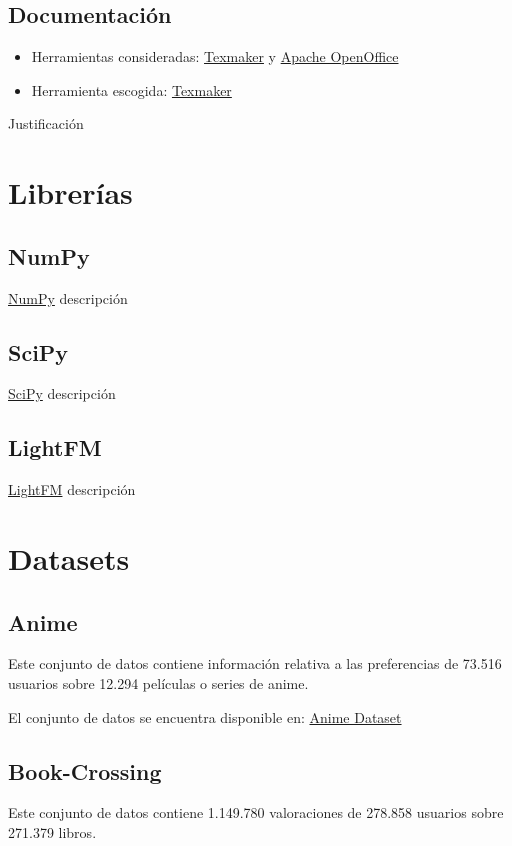 \subsection{Documentación}\label{documentacion}
\begin{itemize}
\tightlist
\item Herramientas consideradas: 
	\href{http://www.xm1math.net/texmaker/}{Texmaker} y
	\href{https://www.openoffice.org/es/}{Apache OpenOffice}
\item Herramienta escogida:
	\href{http://www.xm1math.net/texmaker/}{Texmaker}
\end{itemize}
Justificación

\section{Librerías}\label{librerias}
\subsection{NumPy}\label{numpy}
\href{http://www.numpy.org/}{NumPy} descripción
\subsection{SciPy}\label{scipy}
\href{https://www.scipy.org/scipylib/index.html}{SciPy} descripción
\subsection{LightFM}\label{lightfm}
\href{https://github.com/lyst/lightfm}{LightFM} descripción

\section{Datasets}\label{datasets}
\subsection{Anime}\label{anime}
Este conjunto de datos \cite{CopperUnion2017} contiene información relativa a las preferencias de 73.516 usuarios sobre 12.294 películas o series de anime.

El conjunto de datos se encuentra disponible en: \href{https://www.kaggle.com/CooperUnion/anime-recommendations-database/downloads/anime-recommendations-database.zip/1}{Anime Dataset}
\subsection{Book-Crossing}\label{book-crossing}
Este conjunto de datos \cite{Ziegler2004} contiene 1.149.780 valoraciones de 278.858 usuarios sobre 271.379 libros.

